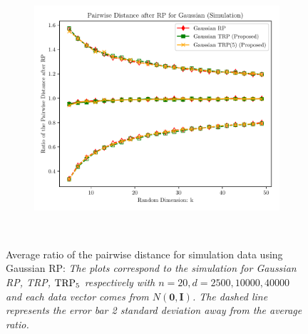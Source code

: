 \begin{figure}[ht!]
\begin{subfigure}{0.32\textwidth}
	\end{subfigure}
	\begin{subfigure}{0.32\textwidth}
		\includegraphics[scale = 0.3]{figure/dist_g_d40000.pdf}
	\end{subfigure}
	\\
	\caption{Average ratio of the pairwise distance for simulation data using Gaussian RP: \textit{The  plots correspond to the simulation for Gaussian RP, TRP, $\textup{TRP}_5$ respectively with $n = 20, d = 2500, 10000, 40000$ and each data vector comes from $N(\mathbf{0}, \mathbf{I})$. The dashed line represents the error bar 2 standard deviation away from the average ratio.}} 
	\label{fig:gaussian}
\end{figure}

